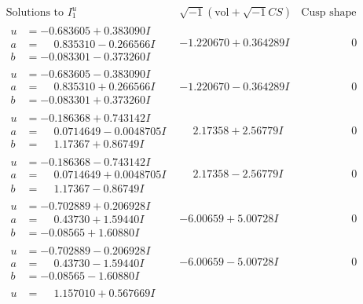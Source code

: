 \documentclass[1p]{elsarticle_modified}
\theoremstyle{definition}
\newcommand{\I}{\sqrt{-1}}
\begin{document}
$$\begin{array}{c|c|c}
\text{Solutions to }I^u_{1}& \I (\text{vol} + \sqrt{-1}CS) & \text{Cusp shape}\\
 \hline 
\begin{aligned}
u &= -0.683605 + 0.383090 I \\
a &= \phantom{-}0.835310 - 0.266566 I \\
b &= -0.083301 - 0.373260 I\end{aligned}
 & -1.220670 + 0.364289 I & \phantom{-0.000000 } 0 \\ \hline\begin{aligned}
u &= -0.683605 - 0.383090 I \\
a &= \phantom{-}0.835310 + 0.266566 I \\
b &= -0.083301 + 0.373260 I\end{aligned}
 & -1.220670 - 0.364289 I & \phantom{-0.000000 } 0 \\ \hline\begin{aligned}
u &= -0.186368 + 0.743142 I \\
a &= \phantom{-}0.0714649 - 0.0048705 I \\
b &= \phantom{-}1.17367 + 0.86749 I\end{aligned}
 & \phantom{-}2.17358 + 2.56779 I & \phantom{-0.000000 } 0 \\ \hline\begin{aligned}
u &= -0.186368 - 0.743142 I \\
a &= \phantom{-}0.0714649 + 0.0048705 I \\
b &= \phantom{-}1.17367 - 0.86749 I\end{aligned}
 & \phantom{-}2.17358 - 2.56779 I & \phantom{-0.000000 } 0 \\ \hline\begin{aligned}
u &= -0.702889 + 0.206928 I \\
a &= \phantom{-}0.43730 + 1.59440 I \\
b &= -0.08565 + 1.60880 I\end{aligned}
 & -6.00659 + 5.00728 I & \phantom{-0.000000 } 0 \\ \hline\begin{aligned}
u &= -0.702889 - 0.206928 I \\
a &= \phantom{-}0.43730 - 1.59440 I \\
b &= -0.08565 - 1.60880 I\end{aligned}
 & -6.00659 - 5.00728 I & \phantom{-0.000000 } 0 \\ \hline\begin{aligned}
u &= \phantom{-}1.157010 + 0.567669 I \\

\end{aligned}
\end{array}$$
\end{document}
